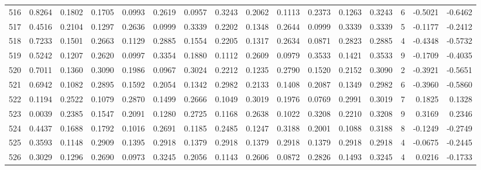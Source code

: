 \begin{tabular}{lrrrrrrrrrrrrrrr}
516 &      0.8264 &  0.1802 &  0.1705 &  0.0993 &  0.2619 &  0.0957 &  0.3243 &  0.2062 &  0.1113 &  0.2373 &   0.1263 &     0.3243 &      6 &                   -0.5021 &                    -0.6462 \\
517 &      0.4516 &  0.2104 &  0.1297 &  0.2636 &  0.0999 &  0.3339 &  0.2202 &  0.1348 &  0.2644 &  0.0999 &   0.3339 &     0.3339 &      5 &                   -0.1177 &                    -0.2412 \\
518 &      0.7233 &  0.1501 &  0.2663 &  0.1129 &  0.2885 &  0.1554 &  0.2205 &  0.1317 &  0.2634 &  0.0871 &   0.2823 &     0.2885 &      4 &                   -0.4348 &                    -0.5732 \\
519 &      0.5242 &  0.1207 &  0.2620 &  0.0997 &  0.3354 &  0.1880 &  0.1112 &  0.2609 &  0.0979 &  0.3533 &   0.1421 &     0.3533 &      9 &                   -0.1709 &                    -0.4035 \\
520 &      0.7011 &  0.1360 &  0.3090 &  0.1986 &  0.0967 &  0.3024 &  0.2212 &  0.1235 &  0.2790 &  0.1520 &   0.2152 &     0.3090 &      2 &                   -0.3921 &                    -0.5651 \\
521 &      0.6942 &  0.1082 &  0.2895 &  0.1592 &  0.2054 &  0.1342 &  0.2982 &  0.2133 &  0.1408 &  0.2087 &   0.1349 &     0.2982 &      6 &                   -0.3960 &                    -0.5860 \\
522 &      0.1194 &  0.2522 &  0.1079 &  0.2870 &  0.1499 &  0.2666 &  0.1049 &  0.3019 &  0.1976 &  0.0769 &   0.2991 &     0.3019 &      7 &                    0.1825 &                     0.1328 \\
523 &      0.0039 &  0.2385 &  0.1547 &  0.2091 &  0.1280 &  0.2725 &  0.1168 &  0.2638 &  0.1022 &  0.3208 &   0.2210 &     0.3208 &      9 &                    0.3169 &                     0.2346 \\
524 &      0.4437 &  0.1688 &  0.1792 &  0.1016 &  0.2691 &  0.1185 &  0.2485 &  0.1247 &  0.3188 &  0.2001 &   0.1088 &     0.3188 &      8 &                   -0.1249 &                    -0.2749 \\
525 &      0.3593 &  0.1148 &  0.2909 &  0.1395 &  0.2918 &  0.1379 &  0.2918 &  0.1379 &  0.2918 &  0.1379 &   0.2918 &     0.2918 &      4 &                   -0.0675 &                    -0.2445 \\
526 &      0.3029 &  0.1296 &  0.2690 &  0.0973 &  0.3245 &  0.2056 &  0.1143 &  0.2606 &  0.0872 &  0.2826 &   0.1493 &     0.3245 &      4 &                    0.0216 &                    -0.1733 \\

\end{tabular}
